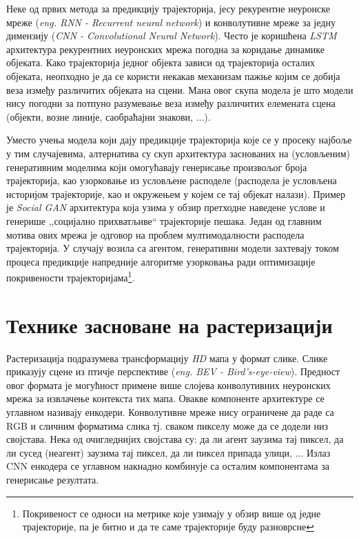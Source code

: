 \documentclass[11pt,oneside]{memoir}
\begin{document}
Неке од првих метода за предикцију трајекторија, јесу рекурентне неуронске мреже 
(\textit{eng. RNN - Recurrent neural network}) и конволутивне мреже за једну димензију (\textit{CNN - Convolutional Neural Network}). 
Често је коришћена \textit{LSTM} архитектура рекурентних неуронских мрежа погодна за коридање динамике објеката. 
Како трајекторија једног објекта зависи од трајекторија осталих објеката,
неопходно је да се користи некакав механизам пажње којим се добија веза између различитих објеката на сцени. \cite{argoverse} \cite{social_lstm} 
Мана овог скупа модела је што модели нису погодни за потпуно разумевање веза између различитих елемената сцена (објекти, возне линије, саобраћајни знакови, ...).

Уместо учења модела који дају предикције трајекторија које се у просеку најбоље у тим случајевима, 
алтернатива су скуп архитектура заснованих на (условљеним) генеративним моделима који
омогућавају генерисање произвољог броја трајекторија, као узорковање из условљене расподеле (расподела је условљена историјом трајекторије, као и
окружењем у којем се тај објекат налази). Пример је \textit{Social GAN} \cite{social_gan} архитектура која узима у обзир претходне наведене услове и генерише ,,социјално прихватљиве`` трајекторије
пешака. Један од главним мотива ових мрежа је одговор на проблем мултимодалности расподела трајекторија. 
У случају возила са агентом, генеративни модели захтевају током процеса предикције напредније алгоритме узорковања ради оптимизације покривености
трајекторијама\footnote{Покривеност се односи на метрике које узимају у обзир више од једне трајекторије, па је битно и да те
саме трајекторије буду разноврсне}.

\section{Технике засноване на растеризацији}

Растеризација подразумева трансформацију \textit{HD} мапа у формат слике. Слике приказују сцене из птичје перспективе (\textit{eng. BEV - Bird's-eye-view}).
Предност овог формата је могућност примене више слојева конволутивних неуронских мрежа за извлачење 
контекста тих мапа. Овакве компоненте архитектуре се углавном називају енкодери. Конволутивне мреже нису ограничене да раде са RGB 
и сличним форматима слика тј. сваком пикселу може да се додели низ својстава. Нека од очигледнијих својстава су: да ли агент заузима тај пиксел, 
да ли сусед (неагент) заузима тај пиксел,
да ли пиксел припада улици, ... Излаз CNN енкодера се углавном накнадно комбинује са осталим компонентама за генерисање резултата. 
\end{document}
